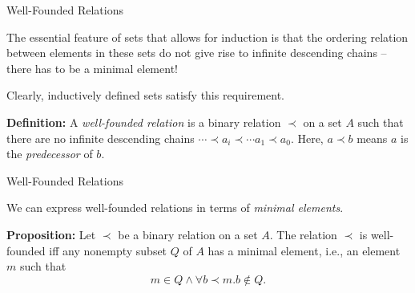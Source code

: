 \documentclass{beamer}
\begin{document}
\begin{frame}{Well-Founded Relations}

\small

The essential feature of sets that allows for induction is that the ordering relation between elements in
these sets do not give rise to infinite descending chains -- there has to be a minimal element!

\vspace{.1in}
Clearly, inductively defined sets satisfy this requirement.  

\vspace{.1in}

{\bf Definition:} A {\em well-founded relation} is a binary relation $\prec$ on a set $A$
such that there are no infinite descending chains $\cdots \prec a_i \prec \cdots a_1 \prec a_0$.
Here, $a \prec b$ means $a$ is the {\em predecessor} of $b$.
\end{frame}

\begin{frame}{Well-Founded Relations}

\small

We can express well-founded relations in terms of {\em minimal elements}.

\vspace{.1in}

{\bf Proposition:} Let $\prec$ be a binary relation on a set $A$.
The relation $\prec$ is well-founded iff any nonempty subset 
$Q$ of $A$ has a minimal element, i.e., an element $m$ such that
\[
m\in Q \wedge \forall b \prec m.b \not\in Q.
\]

\vspace{.5in}


\end{frame}
\end{document}
